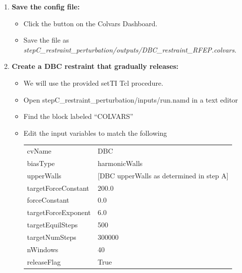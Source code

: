 \documentclass[9pt,tutorial]{Styling/livecoms}
\newcommand{\filepath}[1]{\textit{#1}}
\newcommand{\button}[1]{
  \inlineBox[gray]{\texttt{#1}}
}
\begin{document}
\begin{enumerate}[label=\arabic*.]
\begin{enumerate}[label=\alph*., ref=\theenumi.\alph*]
            \item \textbf{Save the config file:}
            \begin{itemize}
                \item Click the \button{Save} button on the Colvars Dashboard.
                \item Save the file as \filepath{stepC\_restraint\_perturbation/outputs/DBC\_restraint\_RFEP.colvars}.
            \end{itemize}
        \item \textbf{Create a DBC restraint that gradually releases:} 
            \begin{itemize}
            \item We will use the provided setTI Tcl procedure.
            \item Open stepC\_restraint\_perturbation/inputs/run.namd in a text editor
            \item Find the block labeled ``COLVARS''
            \item Edit the input variables to match the following\\
            { \ttfamily
            \begin{tabular}{l l}
                cvName & DBC\\
                biasType & harmonicWalls\\
                upperWalls & [DBC upperWalls as determined in step A]\\
                targetForceConstant & 200.0\\
                forceConstant & 0.0\\
                targetForceExponent & 6.0\\
                targetEquilSteps & 500\\
                targetNumSteps & 300000\\
                nWindows & 40\\
                releaseFlag & True
            \end{tabular} }
            \end{itemize}
        \end{enumerate}
        

\end{enumerate}
\end{document}
